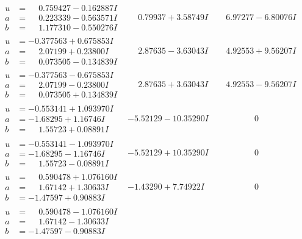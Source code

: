 \documentclass[1p]{elsarticle_modified}
\theoremstyle{definition}
\begin{document}
$$\begin{array}{c|c|c}
\begin{aligned}
u &= \phantom{-}0.759427 - 0.162887 I \\
a &= \phantom{-}0.223339 - 0.563571 I \\
b &= \phantom{-}1.177310 - 0.550276 I\end{aligned}
 & \phantom{-}0.79937 + 3.58749 I & \phantom{-}6.97277 - 6.80076 I \\ \hline\begin{aligned}
u &= -0.377563 + 0.675853 I \\
a &= \phantom{-}2.07199 + 0.23800 I \\
b &= \phantom{-}0.073505 - 0.134839 I\end{aligned}
 & \phantom{-}2.87635 - 3.63043 I & \phantom{-}4.92553 + 9.56207 I \\ \hline\begin{aligned}
u &= -0.377563 - 0.675853 I \\
a &= \phantom{-}2.07199 - 0.23800 I \\
b &= \phantom{-}0.073505 + 0.134839 I\end{aligned}
 & \phantom{-}2.87635 + 3.63043 I & \phantom{-}4.92553 - 9.56207 I \\ \hline\begin{aligned}
u &= -0.553141 + 1.093970 I \\
a &= -1.68295 + 1.16746 I \\
b &= \phantom{-}1.55723 + 0.08891 I\end{aligned}
 & -5.52129 - 10.35290 I & \phantom{-0.000000 } 0 \\ \hline\begin{aligned}
u &= -0.553141 - 1.093970 I \\
a &= -1.68295 - 1.16746 I \\
b &= \phantom{-}1.55723 - 0.08891 I\end{aligned}
 & -5.52129 + 10.35290 I & \phantom{-0.000000 } 0 \\ \hline\begin{aligned}
u &= \phantom{-}0.590478 + 1.076160 I \\
a &= \phantom{-}1.67142 + 1.30633 I \\
b &= -1.47597 + 0.90883 I\end{aligned}
 & -1.43290 + 7.74922 I & \phantom{-0.000000 } 0 \\ \hline\begin{aligned}
u &= \phantom{-}0.590478 - 1.076160 I \\
a &= \phantom{-}1.67142 - 1.30633 I \\
b &= -1.47597 - 0.90883 I\end{aligned}

\end{array}$$
\end{document}

